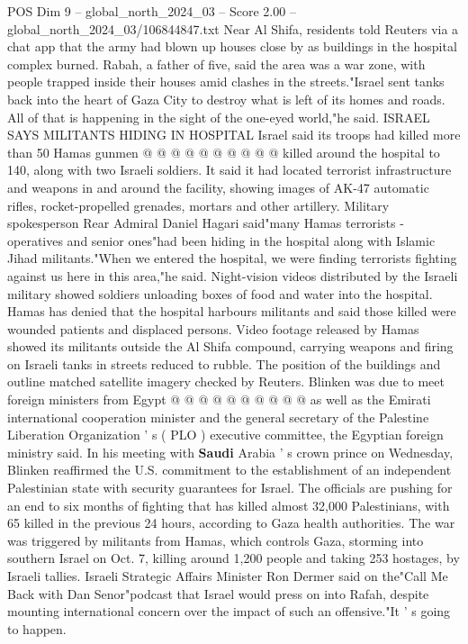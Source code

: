 \begin{textsample}{POS Dim 9 – global\_north\_2024\_03 – Score 2.00 – global\_north\_2024\_03/106844847.txt}
Near Al Shifa, residents told Reuters via a chat app that the army had blown up houses close by as buildings in the hospital complex burned.
Rabah, a father of five, said the area was a war zone, with people trapped inside their houses amid clashes in the streets."Israel sent tanks back into the heart of Gaza City to destroy what is left of its homes and roads.
All of that is happening in the sight of the one-eyed world,"he said.
ISRAEL SAYS MILITANTS HIDING IN HOSPITAL Israel said its troops had killed more than 50 Hamas gunmen @ @ @ @ @ @ @ @ @ @ killed around the hospital to 140, along with two Israeli soldiers.
It said it had located terrorist infrastructure and weapons in and around the facility, showing images of AK-47 automatic rifles, rocket-propelled grenades, mortars and other artillery.
Military spokesperson Rear Admiral Daniel Hagari said"many Hamas terrorists - operatives and senior ones"had been hiding in the hospital along with Islamic Jihad militants."When we entered the hospital, we were finding terrorists fighting against us here in this area,"he said.
Night-vision videos distributed by the Israeli military showed soldiers unloading boxes of food and water into the hospital.
Hamas has denied that the hospital harbours militants and said those killed were wounded patients and displaced persons.
Video footage released by Hamas showed its militants outside the Al Shifa compound, carrying weapons and firing on Israeli tanks in streets reduced to rubble.
The position of the buildings and outline matched satellite imagery checked by Reuters.
Blinken was due to meet foreign ministers from Egypt @ @ @ @ @ @ @ @ @ @ as well as the Emirati international cooperation minister and the general secretary of the Palestine Liberation Organization ' s ( PLO ) executive committee, the Egyptian foreign ministry said.
In his meeting with \textbf{Saudi} Arabia ' s crown prince on Wednesday, Blinken reaffirmed the U.S. commitment to the establishment of an independent Palestinian state with security guarantees for Israel.
The officials are pushing for an end to six months of fighting that has killed almost 32,000 Palestinians, with 65 killed in the previous 24 hours, according to Gaza health authorities.
The war was triggered by militants from Hamas, which controls Gaza, storming into southern Israel on Oct. 7, killing around 1,200 people and taking 253 hostages, by Israeli tallies.
Israeli Strategic Affairs Minister Ron Dermer said on the"Call Me Back with Dan Senor"podcast that Israel would press on into Rafah, despite mounting international concern over the impact of such an offensive."It ' s going to happen.

\end{textsample}
